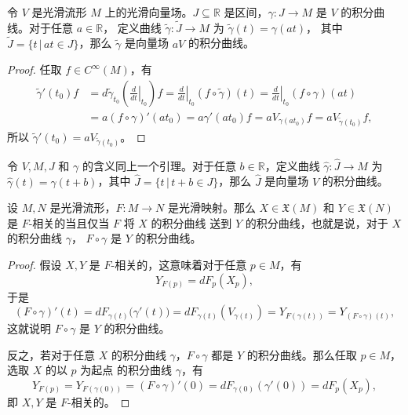 \documentclass[fontset=none]{Notes}
\begin{document}
\begin{lemma}[缩放引理]
  令 $V$ 是光滑流形 $M$ 上的光滑向量场。$J\subseteq \mathbb{R}$
  是区间，$\gamma:J\to M$ 是 $V$ 的积分曲线。对于任意 $a\in \mathbb{R}$，
  定义曲线 $\tilde \gamma:\tilde{J}\to M$ 为 $\tilde{\gamma}(t)=\gamma(at)$，
  其中 $\tilde{J}=\{t\,|\, at\in J\}$，那么 $\tilde{\gamma}$ 是向量场
  $aV$ 的积分曲线。
\end{lemma}
\begin{proof}
  任取 $f\in C^\infty(M)$，有
  \begin{align*}
    \tilde{\gamma}'(t_0)f&=d\tilde{\gamma}_{t_0}\left(
      \left.\frac{d}{dt}\right|_{t_0}
    \right)f
    =\left.\frac{d}{dt}\right|_{t_0}(f\circ\tilde\gamma)(t)
    =\left.\frac{d}{dt}\right|_{t_0}(f\circ\gamma)(at)\\
    &=a (f\circ\gamma)'(at_0)
    =a\gamma'(at_0)f=aV_{\gamma(at_0)}f=
    aV_{\tilde{\gamma}(t_0)}f,
  \end{align*}
  所以 $\tilde{\gamma}'(t_0)=aV_{\tilde{\gamma}(t_0)}$。
\end{proof}

\begin{lemma}[平移引理]
  令 $V,M,J$ 和 $\gamma$ 的含义同上一个引理。对于任意
  $b\in \mathbb{R}$，定义曲线 $\hat\gamma:\hat J\to M$
  为 $\hat \gamma(t)=\gamma(t+b)$，其中
  $\hat J=\{t\,|\, t+b\in J\}$，那么 $\hat J$ 是向量场
  $V$ 的积分曲线。
\end{lemma}

\begin{proposition}[积分曲线的自然性]
  设 $M,N$ 是光滑流形，$F:M\to N$ 是光滑映射。那么 $X\in \mathfrak{X}(M)$
  和 $Y\in \mathfrak{X}(N)$ 是 $F$-相关的当且仅当 $F$ 将 $X$ 的积分曲线
  送到 $Y$ 的积分曲线，也就是说，对于 $X$ 的积分曲线 $\gamma$，
  $F\circ\gamma$ 是 $Y$ 的积分曲线。
\end{proposition}
\begin{proof}
  假设 $X,Y$ 是 $F$-相关的，这意味着对于任意 $p\in M$，有
  \[
    Y_{F(p)}=dF_p(X_p),
  \]
  于是
  \[
    (F\circ\gamma)'(t)
    =dF_{\gamma(t)}\bigl(\gamma'(t)\bigr)
    =dF_{\gamma(t)}(V_{\gamma(t)})=Y_{F(\gamma(t))}
    =Y_{(F\circ\gamma)(t)},
  \]
  这就说明 $F\circ\gamma$ 是 $Y$ 的积分曲线。

  反之，若对于任意 $X$ 的积分曲线 $\gamma$，$F\circ\gamma$ 都是
  $Y$ 的积分曲线。那么任取 $p\in M$，选取 $X$ 的以 $p$ 为起点
  的积分曲线 $\gamma$，有
  \[
    Y_{F(p)}=Y_{F(\gamma(0))}=(F\circ\gamma)'(0)
    =dF_{\gamma(0)}(\gamma'(0))=dF_p(X_p),  
  \]
  即 $X,Y$ 是 $F$-相关的。
\end{proof}
\end{document}
